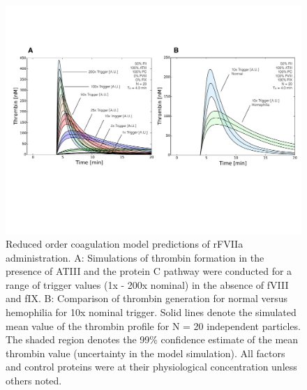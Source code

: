 \documentclass[12pt]{article}
\begin{document}
\begin{figure}
\centering
\includegraphics[width=1.0\textwidth]{./figs/Figure-7-rFVIIa-Trigger.pdf}
\caption{Reduced order coagulation model predictions of rFVIIa administration. 
A: Simulations of thrombin formation in the presence of ATIII and the protein C pathway were conducted for a range of trigger values (1x - 200x nominal) in the absence of fVIII and fIX.
B: Comparison of thrombin generation for normal versus hemophilia for 10x nominal trigger.
Solid lines denote the simulated mean value of the thrombin profile for N = 20 independent particles.
The shaded region denotes the 99\% confidence estimate of the mean thrombin value (uncertainty in the model simulation). 
All factors and control proteins were at their physiological concentration unless others noted.}\label{fig-rFVII}
\end{figure}

\clearpage
\end{document}
